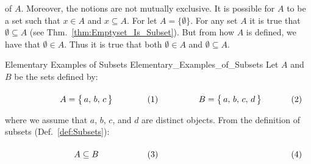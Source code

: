         of $A$. Moreover, the notions are not mutually exclusive. It is possible
        for $A$ to be a set such that $x\in{A}$ and $x\subseteq{A}$. For let
        $A=\{\emptyset\}$. For any set $A$ it is true that
        $\emptyset\subseteq{A}$ (see Thm.~\ref{thm:Emptyset_Is_Subset}). But
        from how $A$ is defined, we have that $\emptyset\in{A}$. Thus it is true
        that both $\emptyset\in{A}$ and $\emptyset\subseteq{A}$.
        \begin{fexample}{Elementary Examples of Subsets}
                        {Elementary_Examples_of_Subsets}
            Let $A$ and $B$ be the sets defined by:
            \par\hfill\par
            \begin{subequations}
                \begin{minipage}[b]{0.49\textwidth}
                    \begin{equation}
                        A=\big\{\,a,\,b,\,c\,\big\}
                    \end{equation}
                \end{minipage}
                \hfill
                \begin{minipage}[b]{0.49\textwidth}
                    \begin{equation}
                        B=\big\{\,a,\,b,\,c,\,d\,\big\}
                    \end{equation}
                \end{minipage}
            \end{subequations}
            \par\vspace{2.5ex}
            where we assume that $a$, $b$, $c$, and $d$ are distinct objects.
            From the definition of subsets (Def.~\ref{def:Subsets}):
            \par\hfill\par
            \begin{subequations}
                \begin{minipage}[b]{0.49\textwidth}
                    \begin{equation}
                        A\subseteq{B}
                    \end{equation}
                \end{minipage}
                \hfill
                \begin{minipage}[b]{0.49\textwidth}
                    \begin{equation}

\end{equation}
\end{minipage}
\end{subequations}
\end{fexample}
